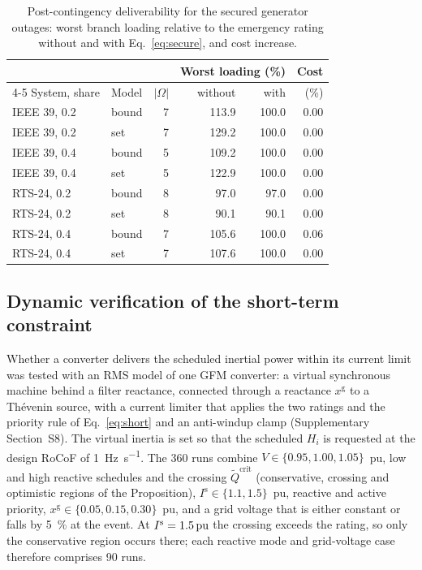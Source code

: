 \begin{table}[t]
  \caption{Post-contingency deliverability for the secured generator outages:
  worst branch loading relative to the emergency rating without and with
  Eq.~\eqref{eq:secure}, and cost increase.}
  \label{tab:secured}
  \centering
  \small
  \begin{tabular*}{\columnwidth}{@{\extracolsep{\fill}}ll r rr r@{}}
    \toprule
    & & & \multicolumn{2}{c}{Worst loading (\%)} & Cost \\
    \cmidrule(lr){4-5}
    System, share & Model & $|\Omega|$ & without & with & (\%) \\
    \midrule
    IEEE 39, 0.2 & bound & 7 & 113.9 & 100.0 & 0.00 \\
    IEEE 39, 0.2 & set & 7 & 129.2 & 100.0 & 0.00 \\
    IEEE 39, 0.4 & bound & 5 & 109.2 & 100.0 & 0.00 \\
    IEEE 39, 0.4 & set & 5 & 122.9 & 100.0 & 0.00 \\
    RTS-24, 0.2 & bound & 8 & 97.0 & 97.0 & 0.00 \\
    RTS-24, 0.2 & set & 8 & 90.1 & 90.1 & 0.00 \\
    RTS-24, 0.4 & bound & 7 & 105.6 & 100.0 & 0.06 \\
    RTS-24, 0.4 & set & 7 & 107.6 & 100.0 & 0.00 \\
    \bottomrule
  \end{tabular*}
\end{table}

\subsection{Dynamic verification of the short-term constraint}
\label{sec:results-dynamic}
\label{sec:applied}

Whether a converter delivers the scheduled inertial power within its current
limit was tested with an RMS model of one GFM converter: a virtual
synchronous machine behind a filter reactance, connected through a reactance
$x^{\mathrm{g}}$ to a Th\'evenin source, with a current limiter that applies
the two ratings and the priority rule of Eq.~\eqref{eq:short} and an
anti-windup clamp (Supplementary Section~S8). The virtual inertia is set so
that the scheduled $H_i$ is requested at the design RoCoF of
\SI{1}{\hertz\per\second}. The \num{360} runs combine $V \in \{0.95, 1.00,
1.05\}$~pu, low and high reactive schedules and the crossing
$\tilde{Q}^{\mathrm{crit}}$ (conservative, crossing and optimistic regions of
the Proposition), $I^{\mathrm{s}} \in \{1.1, 1.5\}$~pu, reactive and active
priority, $x^{\mathrm{g}} \in \{0.05, 0.15, 0.30\}$~pu, and a grid voltage
that is either constant or falls by \SI{5}{\percent} at the event. At
$I^{\mathrm{s}} = \SI{1.5}{\ensuremath{\mathrm{pu}}}$ the crossing exceeds the rating, so only
the conservative region occurs there; each reactive mode and grid-voltage
case therefore comprises \num{90} runs.

